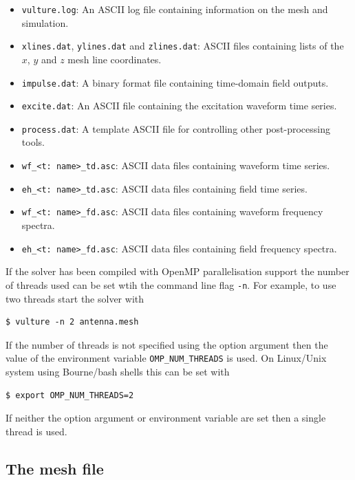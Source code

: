\documentclass[onecolumn,a4paper]{article}
\numberwithin{equation}{section}
\begin{document}
\begin{itemize}
 \item \texttt{vulture.log}: An ASCII log file containing information on the mesh and simulation.
 \item \texttt{xlines.dat}, \texttt{ylines.dat} and \texttt{zlines.dat}: ASCII files containing lists
 of the $x$, $y$ and $z$ mesh line coordinates.
 \item \texttt{impulse.dat}: A binary format file containing time-domain field outputs.
 \item \texttt{excite.dat}: An ASCII file containing the excitation waveform time series.
 \item \texttt{process.dat}: A template ASCII file for controlling other post-processing tools.
 \item \texttt{wf\_<t:~name>\_td.asc}: ASCII data files containing waveform time series.
 \item \texttt{eh\_<t:~name>\_td.asc}: ASCII data files containing field time series.
 \item \texttt{wf\_<t:~name>\_fd.asc}: ASCII data files containing waveform frequency spectra.
 \item \texttt{eh\_<t:~name>\_fd.asc}: ASCII data files containing field frequency spectra.
\end{itemize}

If the solver has been compiled with OpenMP parallelisation support the number of threads used
can be set wtih the command line flag \texttt{-n}. For example, to use two threads start the
solver with
\begin{verbatim}
$ vulture -n 2 antenna.mesh
\end{verbatim}
If the number of threads is not specified using the option argument then the
value of the environment variable \texttt{OMP\_NUM\_THREADS} is used. On Linux/Unix
system using Bourne/bash shells this can be set with
\begin{verbatim}
$ export OMP_NUM_THREADS=2
\end{verbatim}
If neither the option argument or environment variable are set then a single thread is used.

\subsection{The mesh file}
\label{ssc:meshfile}
\end{document}
